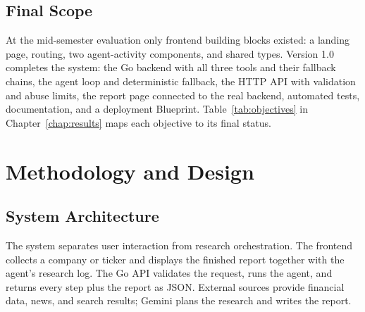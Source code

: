\documentclass[12pt,a4paper,oneside]{report}
\begin{document}
\section{Final Scope}
At the mid-semester evaluation only frontend building blocks existed: a landing page, routing, two agent-activity components, and shared types. Version 1.0 completes the system: the Go backend with all three tools and their fallback chains, the agent loop and deterministic fallback, the HTTP API with validation and abuse limits, the report page connected to the real backend, automated tests, documentation, and a deployment Blueprint. Table~\ref{tab:objectives} in Chapter~\ref{chap:results} maps each objective to its final status.

\chapter{Methodology and Design}
\section{System Architecture}
The system separates user interaction from research orchestration. The frontend collects a company or ticker and displays the finished report together with the agent's research log. The Go API validates the request, runs the agent, and returns every step plus the report as JSON. External sources provide financial data, news, and search results; Gemini plans the research and writes the report.
\end{document}
